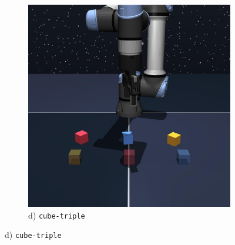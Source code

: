 \begin{figure}[t]
\begin{minipage}{0.24\textwidth}
\begin{subfigure}{\textwidth}
            \includegraphics[width=0.98\linewidth]{figures/renders/cube-triple-play-singletask-task2-v0.jpeg}
            \caption{\footnotesize d) \texttt{cube-triple}}
            \label{fig:cube-triple-viz}
        \end{subfigure}
    \end{minipage}
    

\end{figure}

